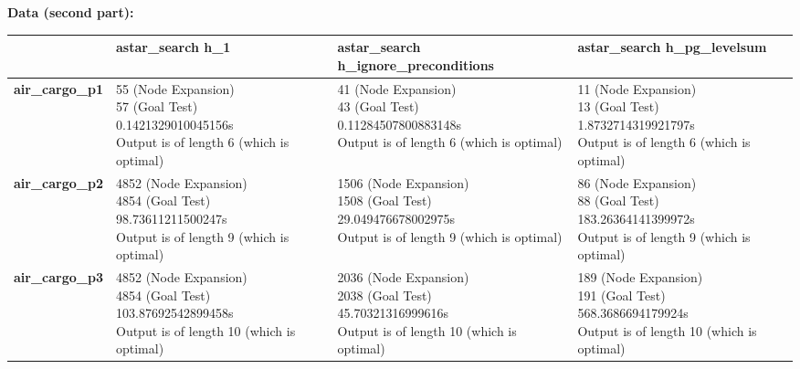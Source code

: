 \documentclass{article}
\begin{document}
  \textbf{Data (second part):}\\
 \begin{center}
   \begin{tabular}{ | l | p{5cm} | p{5cm} | p{5cm} | }
     \hline
      &
      \textbf{astar\_search h\_1}
      &
      \textbf{astar\_search h\_ignore\_preconditions}
      &
      \textbf{astar\_search h\_pg\_levelsum} \\ \hline
     \textbf{air\_cargo\_p1}
     &
     \parbox[t]{5cm}{55 (Node Expansion)\\57 (Goal Test)\\0.1421329010045156s \\}
     Output is of length 6 (which is optimal)

     &
     \parbox[t]{5cm}{41 (Node Expansion)\\43 (Goal Test)\\0.11284507800883148s \\}
     Output is of length 6 (which is optimal)
     &
     \parbox[t]{5cm}{11 (Node Expansion)\\13 (Goal Test)\\1.8732714319921797s \\}
     Output is of length 6 (which is optimal)
     \\ \hline
     \textbf{air\_cargo\_p2}
     &
     \parbox[t]{5cm}{4852 (Node Expansion)\\4854 (Goal Test)\\98.73611211500247s \\}
     Output is of length 9 (which is optimal)
     &
     \parbox[t]{5cm}{1506 (Node Expansion)\\1508 (Goal Test)\\29.049476678002975s \\}
     Output is of length 9 (which is optimal)
     &
     \parbox[t]{5cm}{86 (Node Expansion)\\88 (Goal Test)\\183.26364141399972s \\}
     Output is of length 9 (which is optimal)
      \\ \hline
     \textbf{air\_cargo\_p3}
     &
     \parbox[t]{5cm}{4852 (Node Expansion)\\4854 (Goal Test)\\103.87692542899458s \\}
     Output is of length 10 (which is optimal)
     &
     \parbox[t]{5cm}{2036 (Node Expansion)\\2038 (Goal Test)\\45.70321316999616s \\}
     Output is of length 10 (which is optimal)
     &
     \parbox[t]{5cm}{189 (Node Expansion)\\191 (Goal Test)\\568.3686694179924s \\}
     Output is of length 10 (which is optimal)
     \\
     \hline
   \end{tabular}
   \end{center}
\end{document}
